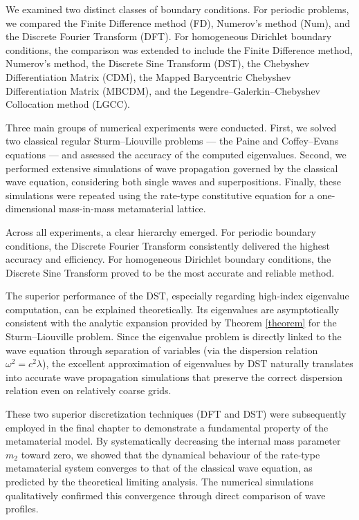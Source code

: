 \documentclass[11pt,a4paper,oneside,openright]{report} %
\begin{document}
We examined two distinct classes of boundary conditions. For periodic problems, we compared the Finite Difference method (FD), Numerov's method (Num), and the Discrete Fourier Transform (DFT). For homogeneous Dirichlet boundary conditions, the comparison was extended to include the Finite Difference method, Numerov's method, the Discrete Sine Transform (DST), the Chebyshev Differentiation Matrix (CDM), the Mapped Barycentric Chebyshev Differentiation Matrix (MBCDM), and the Legendre--Galerkin--Chebyshev Collocation method (LGCC).

Three main groups of numerical experiments were conducted. First, we solved two classical regular Sturm--Liouville problems — the Paine and Coffey--Evans equations — and assessed the accuracy of the computed eigenvalues. Second, we performed extensive simulations of wave propagation governed by the classical wave equation, considering both single waves and superpositions. Finally, these simulations were repeated using the rate-type constitutive equation for a one-dimensional mass-in-mass metamaterial lattice.

Across all experiments, a clear hierarchy emerged. For periodic boundary conditions, the Discrete Fourier Transform consistently delivered the highest accuracy and efficiency. For homogeneous Dirichlet boundary conditions, the Discrete Sine Transform proved to be the most accurate and reliable method.

The superior performance of the DST, especially regarding high-index eigenvalue computation, can be explained theoretically. Its eigenvalues are asymptotically consistent with the analytic expansion provided by Theorem \ref{theorem} for the Sturm--Liouville problem. Since the eigenvalue problem is directly linked to the wave equation through separation of variables (via the dispersion relation $  \omega^2 = c^2 \lambda  $), the excellent approximation of eigenvalues by DST naturally translates into accurate wave propagation simulations that preserve the correct dispersion relation even on relatively coarse grids.

These two superior discretization techniques (DFT and DST) were subsequently employed in the final chapter to demonstrate a fundamental property of the metamaterial model. By systematically decreasing the internal mass parameter $  m_2  $ toward zero, we showed that the dynamical behaviour of the rate-type metamaterial system converges to that of the classical wave equation, as predicted by the theoretical limiting analysis. The numerical simulations qualitatively confirmed this convergence through direct comparison of wave profiles.
\end{document}

